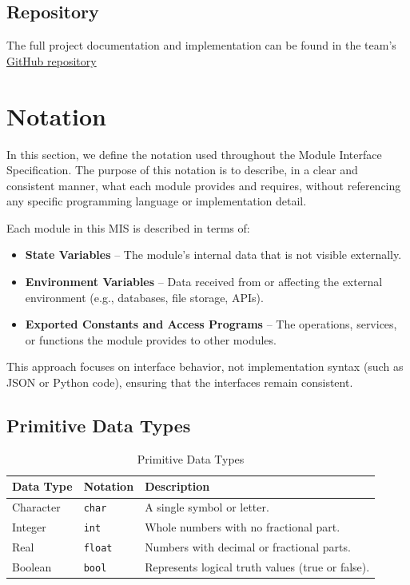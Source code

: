 \documentclass[12pt, titlepage]{article}
\begin{document}
\subsection*{Repository}
The full project documentation and implementation can be found in the team’s \href{https://github.com/DylanG5/sanskrit-cipher}{GitHub repository}  

\section{Notation}

In this section, we define the notation used throughout the Module Interface Specification. The purpose of this notation is to describe, in a clear and consistent manner, what each module provides and requires, without referencing any specific programming language or implementation detail.

Each module in this MIS is described in terms of:
\begin{itemize}
    \item \textbf{State Variables} – The module’s internal data that is not visible externally.
    \item \textbf{Environment Variables} – Data received from or affecting the external environment (e.g., databases, file storage, APIs).
    \item \textbf{Exported Constants and Access Programs} – The operations, services, or functions the module provides to other modules.
\end{itemize}

This approach focuses on interface behavior, not implementation syntax (such as JSON or Python code), ensuring that the interfaces remain consistent.

\subsection{Primitive Data Types}

\begin{table}[H]
\centering
\caption{Primitive Data Types}
\begin{tabular}{lll}
\toprule
\textbf{Data Type} & \textbf{Notation} & \textbf{Description} \\
\midrule
Character & \texttt{char} & A single symbol or letter. \\
Integer & \texttt{int} & Whole numbers with no fractional part. \\
Real & \texttt{float} & Numbers with decimal or fractional parts. \\
Boolean & \texttt{bool} & Represents logical truth values (true or false). \\
\bottomrule
\end{tabular}
\end{table}
\end{document}
